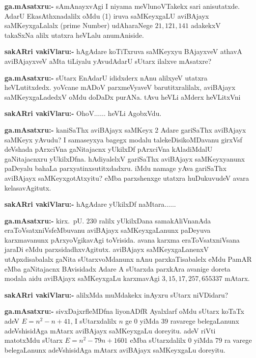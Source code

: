 \smallskip
\noindent
\textbf{ga.mAsatxru:-} sAmAnayxvAgi I niyama meVlunoVTakekx sari anisutatxde. AdarU EkasAthxnadalilx oMdu {\rm (1)} iruva saMKeyxgaLU aviBAjayx saMKeyxgaLalalx {\rm (prime Number)} udAharaNege $21, 121, 141$ adakekxV takaSxNa alilx utatxra heVLalu anumAniside.

\smallskip
\noindent
\textbf{sakARri vakiVlaru:-} hAgAdare koTiTxruva saMKeyxyu BAjayxveV athavA aviBAjayxveV aMta tiLiyalu yAvudAdarU sUtarx ilalxve mAsatxre?

\smallskip
\noindent
\textbf{ga.mAsatxru:-} sUtarx EnAdarU ididxderx nAnu alilxyeV utatxra heVLutitxdedx. yoVcane mADoV parxmeVyaveV barutitxralilalx, aviBAjayx saMKeyxgaLadedxV oMdu doDaDx purANa. tAvu heVLi aMderx heVLitxVni

\smallskip
\noindent
\textbf{sakARri vakiVlaru:-} OhoV$\ldots\ldots$ heVLi AgobxVdu.

\smallskip
\noindent
\textbf{ga.mAsatxru:-} kaniSaThx aviBAjayx saMKeyx {\rm 2} Adare gariSaThx aviBAjayx saMKeyx yAvudu? I samaseyxya bagegx modalu talekeDisikoMDavanu girxVsf deVshada pArxciVna gaNitajacnx yUkilxDf pArxciVna kAladiMdalU gaNitajacnxru yUkilxDfna. hAdiyalelxV gariSaThx aviBAjayx saMKeyxyanunx paDeyalu bahaLa parxyatinxsutitxdadxru. iMdu namage yAva gariSaThx aviBAjayx saMKeyxgotAtxyitu? eMba parxshenxge utatxra huDukuvudeV avara kelasavAgitutx.

\smallskip
\noindent
\textbf{sakARri vakiVlaru:-} hAgAdare yUkilxDf naMtara$\ldots\ldots$

\smallskip
\noindent
\textbf{ga.mAsatxru:-} kirx.~pU. {\rm 230} ralilx yUkilxDana samakAliVnanAda eraToVsatxniVsf\break eMbuvanu aviBAjayx saMKeyxgaLanunx paDeyuva karxmavanunx pArxyoVgikavAgi toVrisida. avana karxma eraToVsatxniVsana jaraDi eMdu parxsidadhxvAgitutx. aviBAjayx saMKeyxgaLanenxV utApxdisabalalx gaNita sUtarxvoMdanunx nAnu parxkaTisabalelx eMdu PamAR eMba gaNita\-jacnx BAvisidadx Adare A sUtarxda parxkAra avanige doreta modala aidu aviBAjayx saMKeyxgaLu karxmavAgi $3, 15, 17, 257, 655337$ mAtarx.

\smallskip
\noindent
\textbf{sakARri vakiVlaru:-} alilxMda muMdakekx inAyxru sUtarx niVDidaru?

\smallskip
\noindent
\textbf{ga.mAsatxru:-} sivxDajxrfleMDfna liyonADfR Ayalxlarf oMdu sUtarx koTaTx adeV $E=n^2-n+41$, I sUtarxdalilx $n$ ge {\rm 0} yiMda {\rm 39} ravarege belegaLanunx adeVshisidAga mAtarx aviBAjayx saMKeyxgaLu doreyitu. adeV riVti matotxMdu sUtarx $E=n^2-79n+1601$ eMba sUtarxdalilx {\rm 0} yiMda {\rm 79} ra varege belegaLanunx adeVshisidAga mAtarx aviBAjayx saMKeyxgaLu doreyitu.

